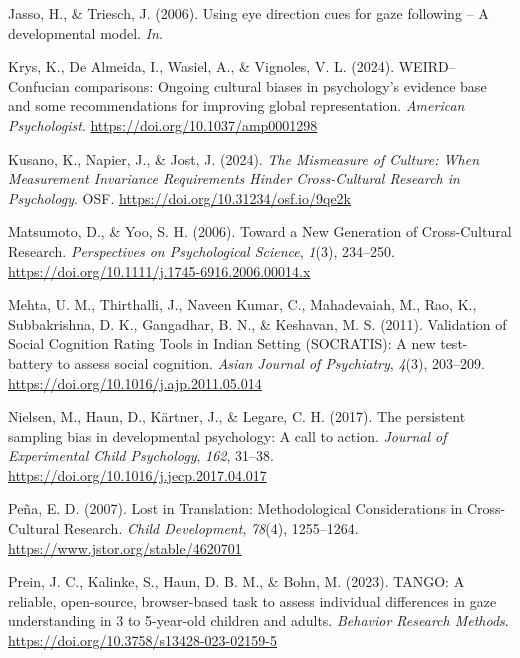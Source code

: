 \documentclass[
  man,mask,floatsintext]{apa7}
\newlength{\cslhangindent}
\newlength{\cslentryspacingunit} %
\newenvironment{CSLReferences}[2] %
 {%
  \setlength{\parindent}{0pt}
  \ifodd #1
  \let\oldpar\par
  \def\par{\hangindent=\cslhangindent\oldpar}
  \fi
  \setlength{\parskip}{#2\cslentryspacingunit}
 }%
 {}
\begin{document}
\begin{CSLReferences}{1}{0}
\leavevmode{}%
Jasso, H., \& Triesch, J. (2006). Using eye direction cues for gaze following -- {A} developmental model. \emph{In}.

\leavevmode{}%
Krys, K., De Almeida, I., Wasiel, A., \& Vignoles, V. L. (2024). {WEIRD}--{Confucian} comparisons: {Ongoing} cultural biases in psychology's evidence base and some recommendations for improving global representation. \emph{American Psychologist}. \url{https://doi.org/10.1037/amp0001298}

\leavevmode{}%
Kusano, K., Napier, J., \& Jost, J. (2024). \emph{The {Mismeasure} of {Culture}: {When Measurement Invariance Requirements Hinder Cross-Cultural Research} in {Psychology}}. OSF. \url{https://doi.org/10.31234/osf.io/9qe2k}

\leavevmode{}%
Matsumoto, D., \& Yoo, S. H. (2006). Toward a {New Generation} of {Cross-Cultural Research}. \emph{Perspectives on Psychological Science}, \emph{1}(3), 234--250. \url{https://doi.org/10.1111/j.1745-6916.2006.00014.x}

\leavevmode{}%
Mehta, U. M., Thirthalli, J., Naveen Kumar, C., Mahadevaiah, M., Rao, K., Subbakrishna, D. K., Gangadhar, B. N., \& Keshavan, M. S. (2011). Validation of {Social Cognition Rating Tools} in {Indian Setting} ({SOCRATIS}): {A} new test-battery to assess social cognition. \emph{Asian Journal of Psychiatry}, \emph{4}(3), 203--209. \url{https://doi.org/10.1016/j.ajp.2011.05.014}

\leavevmode{}%
Nielsen, M., Haun, D., Kärtner, J., \& Legare, C. H. (2017). The persistent sampling bias in developmental psychology: {A} call to action. \emph{Journal of Experimental Child Psychology}, \emph{162}, 31--38. \url{https://doi.org/10.1016/j.jecp.2017.04.017}

\leavevmode{}%
Peña, E. D. (2007). Lost in {Translation}: {Methodological Considerations} in {Cross-Cultural Research}. \emph{Child Development}, \emph{78}(4), 1255--1264. \url{https://www.jstor.org/stable/4620701}

\leavevmode{}%
Prein, J. C., Kalinke, S., Haun, D. B. M., \& Bohn, M. (2023). {TANGO}: {A} reliable, open-source, browser-based task to assess individual differences in gaze understanding in 3 to 5-year-old children and adults. \emph{Behavior Research Methods}. \url{https://doi.org/10.3758/s13428-023-02159-5}


\end{CSLReferences}
\end{document}

